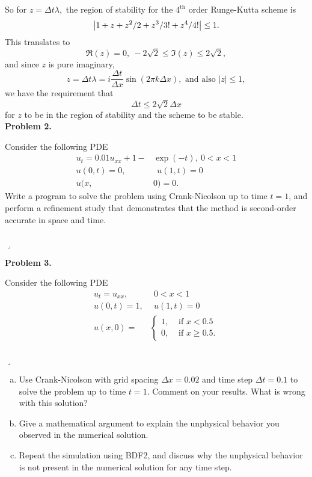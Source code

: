 \documentclass[12pt]{article}
\newenvironment{myprob}[1]
    {%
    \noindent{\Huge$\ulcorner$}\textbf{#1.}\begin{em}
    }
    { 
    \end{em} \\ \hphantom{l} \hfill {\Huge$\lrcorner$} }
\begin{document}
So for $z = \Delta t \lambda,$ the region of stability for the $4^{\text{th}}$ order Runge-Kutta scheme is
$$\abs{1 + z + z^2/2 + z^3/3! + z^4/4!} \leq 1.$$
This translates to $$\Re(z)=0,\  -2\sqrt{2} \leq \Im(z) \leq 2\sqrt{2},$$ 
and since $z$ is pure imaginary, $$z = \Delta t \lambda = i \dfrac{\Delta t}{\Delta x} \sin(2 \pi k \Delta x), \text{ and also } |z| \leq 1,$$
we have the requirement that 
$$ \Delta t \leq 2 \sqrt{2} \Delta x$$
for $z$ to be in the region of stability and the scheme to be stable.\\

\begin{myprob}{Problem 2}
Consider the following PDE
\begin{align*}
u_t = 0.01 u_{xx} + 1 - &\exp(-t), \ 0<x<1 \\
u(0,t)=0, &\ \ u(1,t)=0 \\
u(x,&0) = 0.
\end{align*}
Write a program to solve the problem using Crank-Nicolson up to time $t=1$, and perform a refinement study that demonstrates that the method is second-order accurate in space and time.
\end{myprob}


\begin{myprob}{Problem 3}
Consider the following PDE
\begin{align*}
u_t = u_{xx},& \ \ 0<x<1 \\
u(0,t)=1,& \ \ u(1,t)=0 \\
u(x,0) = &\begin{cases} 1, &\text{ if } x< 0.5 \\
0, &\text{ if } x\geq0.5.
\end{cases}
\end{align*}
\end{myprob}
\begin{enumerate}[(a)]
\item Use Crank-Nicolson with grid spacing $\Delta x = 0.02$ and time step $\Delta t = 0.1$ to solve the problem up to time $t=1$. Comment on your results.  What is wrong with this solution?

\item Give a mathematical argument to explain the unphysical behavior you observed in the numerical solution.

\item Repeat the simulation using BDF2, and discuss why the unphysical behavior is not present in the numerical solution for any time step.

\end{enumerate}
\end{document}
